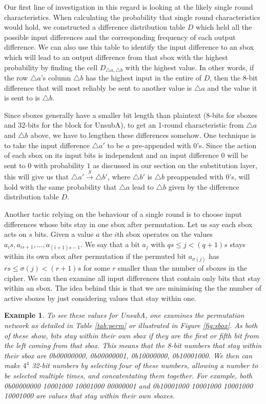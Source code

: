 \documentclass[12pt,a4paper]{article}
\newtheorem{example}[theorem]{Example}
\newenvironment{bigexample}{\begin{shadedbox}\begin{example}\normalfont}{\end{example}\end{shadedbox}}
\newcommand{\differ}[1] {\overset{#1}{\rightarrow}}
\newcommand{\bin}[1] {0b#1}
\begin{document}
Our first line of investigation in this regard is looking at the likely
single round characteristics.
When calculating the probability that single round characteristics would hold,
we constructed a difference distribution table $D$ which held all the possible
input differences and the corresponding frequency of each output difference.
We can also use this table to identify the input difference to an sbox which will lead to
an output difference from that sbox with the highest probability by finding the
cell $D_{\triangle a,\triangle b}$
with the highest value. In other words, if the row $\triangle a$'s column
$\triangle b$ has the highest input in the entire of $D$, then the 8-bit
difference that will most reliably be sent to another value is $\triangle a$
and the value it is sent to is $\triangle b$.

Since sboxes generally have a smaller bit length than plaintext (8-bits for
sboxes and 32-bits for the block for UnsubA), to get an 1-round characteristic
from $\triangle a$ and $\triangle b$ above, we have to lengthen these
differences somehow. One technique is to take the input difference $\triangle
a'$ to be $a$ pre-appended with $0$'s. Since the action of each sbox on its
input bits is independent and an input difference $0$ will be sent to $0$
with probability $1$ as discussed in our section on the substitution layer,
this will give us that $\triangle a' \differ{S} \triangle b'$, where $\triangle
b'$ is $\triangle b$ preappended with $0$'s, will hold with the same
probability that $\triangle a$ lead to $\triangle b$ given by the difference
distribution table $D$.  

Another tactic relying on the behaviour of a single round is to choose input
differences whose bits stay in one sbox after permutation.  Let us say each
sbox acts on $s$ bits. Given a value $a$ the $i$th sbox operates on the values
$a_is, a_{is+1}, \ldots, a_{(i+1)s-1}$. We say that a bit $a_j$ with $qs \leq j <
(q+1)s$ stays within its own sbox after permutation if the permuted bit
$a_{\sigma (j)}$ has $rs \leq \sigma(j) < (r+1)s$ for some $r$ smaller than the
number of sboxes in the cipher. We can then examine all input differences that
contain only bits that stay within an sbox. The idea behind this is that we are
minimising the the number of active sboxes by just considering values that stay
within one.

\begin{bigexample}
\label{exm:stay_sbox}
To see these values for UnsubA, one examines the permutation network as
detailed in Table \ref{tab:perm} or illustrated in Figure \ref{fig:sbox}. As
both of these show, bits stay within their own sbox if they are the first or
fifth bit from the left coming from that sbox. This means that the 8-bit
numbers that stay within their sbox are \bin{00000000}, \bin{00000001},
\bin{10000000},
\bin{10001000}. We then can make $4^4$ 32-bit numbers by selecting four of these
numbers, allowing a number to be selected multiple times, and concatentating them together.
For example, both \bin{00000000 10001000 10001000 00000001} and
\bin{10001000 10001000 10001000 10001000} are values that stay within their own
sboxes.
\end{bigexample}
\end{document}
